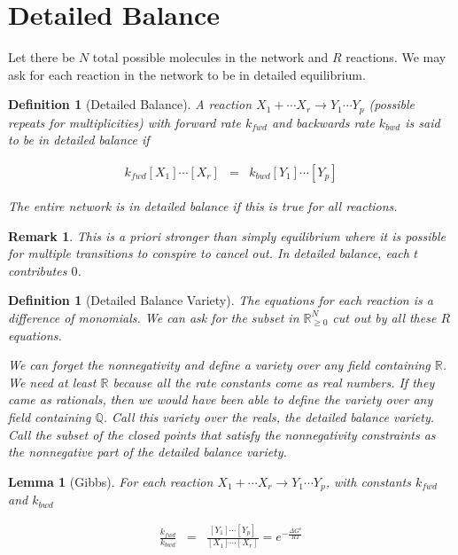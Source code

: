 \documentclass[11pt]{book}
\theoremstyle{change}
\newtheorem{definition}[equation]{Definition}
\newtheorem{lemma}[equation]{Lemma}
\newtheorem{remark}[equation]{Remark}
\theoremstyle{nonumberplain}
\numberwithin{equation}{section}
\begin{document}
\section{Detailed Balance}

Let there be $N$ total possible molecules in the network and $R$ reactions. We may ask for each reaction in the network to be in detailed equilibrium.

\begin{definition}[Detailed Balance]

A reaction $X_1 + \cdots X_r \to Y_1 \cdots Y_p$ (possible repeats for multiplicities) with forward rate $k_{fwd}$ and backwards rate $k_{bwd}$ is said to be in detailed balance if

\begin{eqnarray*}
k_{fwd} [X_1] \cdots [X_r] &=& k_{bwd} [Y_1] \cdots [Y_p]
\end{eqnarray*}

The entire network is in detailed balance if this is true for all reactions.
\end{definition}

\begin{remark}
This is a priori stronger than simply equilibrium where it is possible for multiple transitions to conspire to cancel out. In detailed balance, each $t$ contributes $0$.
\end{remark}

\begin{definition}[Detailed Balance Variety]

The equations for each reaction is a difference of monomials. We can ask for the subset in $\mathbb{R}_{\geq 0}^N$ cut out by all these $R$ equations.

We can forget the nonnegativity and define a variety over any field containing $\mathbb{R}$. We need at least $\mathbb{R}$ because all the rate constants come as real numbers. If they came as rationals, then we would have been able to define the variety over any field containing $\mathbb{Q}$. Call this variety over the reals, the detailed balance variety. Call the subset of the closed points that satisfy the nonnegativity constraints as the nonnegative part of the detailed balance variety.
\end{definition}

\begin{lemma}[Gibbs]
For each reaction $X_1 + \cdots X_r \to Y_1 \cdots Y_p$, with constants $k_{fwd}$ and $k_{bwd}$

\begin{eqnarray*}
\frac{k_{fwd}}{k_{bwd}} &=& \frac{ [Y_1] \cdots [Y_p] }{[X_1] \cdots [X_r]} = e^{- \frac{\Delta G^o}{RT}}
\end{eqnarray*}
\end{lemma}
\end{document}
